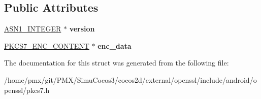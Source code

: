 \subsection*{Public Attributes}
\begin{DoxyCompactItemize}
\item 
\mbox{\label{structpkcs7__enveloped__st_a91a5226c9bef300983bd91b714644a93}} 
\hyperlink{structasn1__string__st}{A\+S\+N1\+\_\+\+I\+N\+T\+E\+G\+ER} $\ast$ {\bfseries version}
\item 
\mbox{\label{structpkcs7__enveloped__st_a371e99999962ee444fd4fa798439681c}} 
\hyperlink{structpkcs7__enc__content__st}{P\+K\+C\+S7\+\_\+\+E\+N\+C\+\_\+\+C\+O\+N\+T\+E\+NT} $\ast$ {\bfseries enc\+\_\+data}
\end{DoxyCompactItemize}


The documentation for this struct was generated from the following file\+:\begin{DoxyCompactItemize}
\item 
/home/pmx/git/\+P\+M\+X/\+Simu\+Cocos3/cocos2d/external/openssl/include/android/openssl/pkcs7.\+h\end{DoxyCompactItemize}
